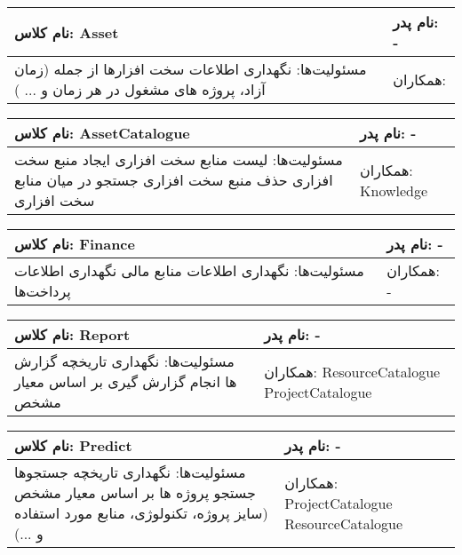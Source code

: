 \begin{tabular}{|p{6cm}|p{6cm}|}
\hline
نام کلاس: Asset
&
نام پدر: - 
\\
\hline
مسئولیت‌ها:
\newline
نگهداری اطلاعات سخت افزارها از جمله (زمان آزاد، پروژه های مشغول در هر زمان و ... )
&
همکاران:
\\
\hline
\end{tabular}
\vspace{1cm}


\begin{tabular}{|p{6cm}|p{6cm}|}
\hline
نام کلاس: AssetCatalogue
&
نام پدر: - 
\\
\hline
مسئولیت‌ها:
\newline
لیست منابع سخت افزاری
\newline
ایجاد منبع سخت افزاری
\newline
حذف منبع سخت افزاری
\newline
جستجو در میان منابع سخت افزاری
&
همکاران:
\newline
Knowledge
\\
\hline
\end{tabular}
\vspace{1cm}

\begin{tabular}{|p{6cm}|p{6cm}|}
\hline
نام کلاس: Finance
&
نام پدر: -
\\
\hline
مسئولیت‌ها:
\newline
نگهداری اطلاعات منابع مالی
\newline
نگهداری اطلاعات پرداخت‌ها
&
همکاران: -
\\
\hline
\end{tabular}
\vspace{1cm}

\begin{tabular}{|p{6cm}|p{6cm}|}
\hline
نام کلاس: Report
&
نام پدر: -
\\
\hline
مسئولیت‌ها:
\newline
نگهداری تاریخچه گزارش ها
\newline
انجام گزارش گیری بر اساس معیار مشخص

&
همکاران:
\newline
ResourceCatalogue
\newline
ProjectCatalogue
\\
\hline
\end{tabular}

\vspace{1cm}

\begin{tabular}{|p{6cm}|p{6cm}|}
\hline
نام کلاس: Predict
&
نام پدر: -
\\
\hline
مسئولیت‌ها:
\newline
نگهداری تاریخچه جستجوها
\newline
جستجو پروژه ها بر اساس معیار مشخص (سایز پروژه، تکنولوژی، منابع مورد استفاده و ...)
&
همکاران:
\newline
ProjectCatalogue
\newline
ResourceCatalogue
\\
\hline
\end{tabular}